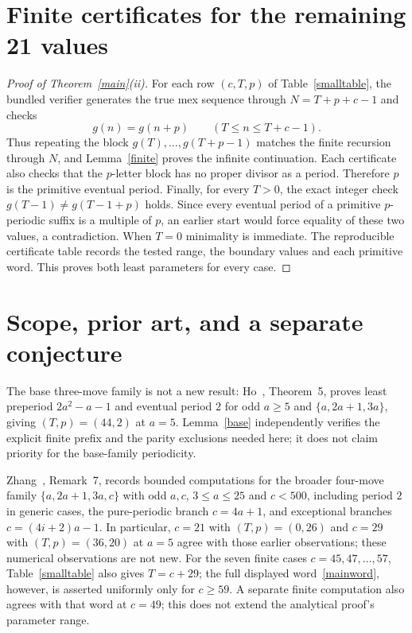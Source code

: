 \documentclass[10pt,a4paper]{article}
\begin{document}
\section{Finite certificates for the remaining 21 values}
\begin{proof}[Proof of Theorem~\ref{main}(ii)]
For each row $(c,T,p)$ of Table~\ref{smalltable}, the bundled verifier generates the true mex sequence through $N=T+p+c-1$ and checks
\begin{equation}\label{finitechecks}
 g(n)=g(n+p)\qquad(T\le n\le T+c-1).
\end{equation}
Thus repeating the block $g(T),\ldots,g(T+p-1)$ matches the finite recursion through $N$, and Lemma~\ref{finite} proves the infinite continuation. Each certificate also checks that the $p$-letter block has no proper divisor as a period. Therefore $p$ is the primitive eventual period. Finally, for every $T>0$, the exact integer check $g(T-1)\ne g(T-1+p)$ holds. Since every eventual period of a primitive $p$-periodic suffix is a multiple of $p$, an earlier start would force equality of these two values, a contradiction. When $T=0$ minimality is immediate. The reproducible certificate table records the tested range, the boundary values and each primitive word. This proves both least parameters for every case.
\end{proof}

\section{Scope, prior art, and a separate conjecture}
The base three-move family is not a new result: Ho~\cite{Ho}, Theorem~5, proves least preperiod $2a^2-a-1$ and eventual period $2$ for odd $a\ge5$ and $\{a,2a+1,3a\}$, giving $(T,p)=(44,2)$ at $a=5$. Lemma~\ref{base} independently verifies the explicit finite prefix and the parity exclusions needed here; it does not claim priority for the base-family periodicity.

Zhang~\cite{Zhang}, Remark~7, records bounded computations for the broader four-move family $\{a,2a+1,3a,c\}$ with odd $a,c$, $3\le a\le25$ and $c<500$, including period $2$ in generic cases, the pure-periodic branch $c=4a+1$, and exceptional branches $c=(4i+2)a-1$. In particular, $c=21$ with $(T,p)=(0,26)$ and $c=29$ with $(T,p)=(36,20)$ at $a=5$ agree with those earlier observations; these numerical observations are not new. For the seven finite cases $c=45,47,\ldots,57$, Table~\ref{smalltable} also gives $T=c+29$; the full displayed word~\eqref{mainword}, however, is asserted uniformly only for $c\ge59$. A separate finite computation also agrees with that word at $c=49$; this does not extend the analytical proof's parameter range.
\end{document}
